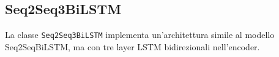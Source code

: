 \subsection{Seq2Seq3BiLSTM}
La classe \texttt{Seq2Seq3BiLSTM} implementa un'architettura simile al modello Seq2SeqBiLSTM, ma con tre layer LSTM bidirezionali nell'encoder.

